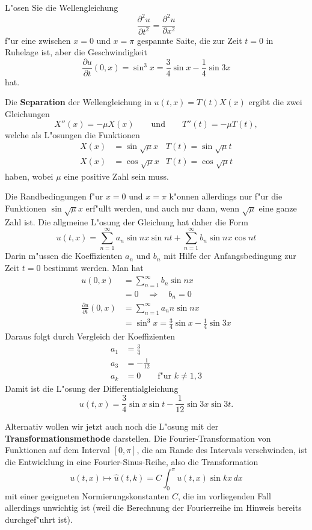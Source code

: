 L"osen Sie die Wellengleichung
\[
\frac{\partial^2 u}{\partial t^2}=\frac{\partial^2 u}{\partial x^2}
\]
f"ur eine zwischen $x=0$ und $x=\pi$ gespannte Saite,
die zur Zeit $t=0$ in Ruhelage ist, aber die Geschwindigkeit
\[
\frac{\partial u}{\partial t}(0, x)
=
\sin^3 x=\frac34\sin x-\frac14\sin 3x
\]
hat.

\begin{loesung}
Die {\bf Separation} der Wellengleichung in $u(t,x)=T(t)X(x)$ ergibt die
zwei Gleichungen
\[
X''(x)=-\mu X(x)\qquad\text{und}\qquad T''(t)=-\mu T(t),
\]
welche als L"osungen die Funktionen
\begin{align*}
X(x)&=\sin\sqrt{\mu}x & T(t)=\sin\sqrt{\mu}t\\
X(x)&=\cos\sqrt{\mu}x & T(t)=\cos\sqrt{\mu}t
\end{align*}
haben, wobei $\mu$ eine positive Zahl sein muss.

Die Randbedingungen f"ur $x=0$ und $x=\pi$ k"onnen allerdings nur
f"ur die Funktionen $\sin\sqrt{\mu}x$ erf"ullt werden, und auch nur dann,
wenn $\sqrt{\mu}$ eine ganze Zahl ist. Die allgmeine L"osung der Gleichung
hat daher die Form
\[
u(t,x)
=
\sum_{n=1}^\infty a_n\sin nx \sin nt+\sum_{n=1}^\infty b_n\sin nx\cos nt
\]
Darin m"ussen die Koeffizienten $a_n$ und $b_n$ mit Hilfe der 
Anfangsbedingung zur Zeit $t=0$ bestimmt werden. Man hat
\begin{align*}
u(0,x)&=
\sum_{n=1}^\infty b_n\sin nx
\\
&=0\quad\Rightarrow\quad b_n=0
\\
\frac{\partial u}{\partial t}(0,x)
&=
\sum_{n=1}^\infty a_nn\sin nx
\\
&=
\sin^3 x=\frac34\sin x-\frac14\sin 3x
\end{align*}
Daraus folgt durch Vergleich der Koeffizienten
\begin{align*}
a_1&=\frac34\\
a_3&=-\frac{1}{12}\\
a_k&=0\qquad\text{f"ur $k\ne 1,3$}
\end{align*}
Damit ist die L"osung der Differentialgleichung
\[
u(t,x)
= \frac34\sin x \sin t -\frac1{12}\sin 3x \sin 3t.
\]

Alternativ wollen wir jetzt auch noch die L"osung mit der
{\bf Transformationsmethode} darstellen. Die Fourier-Transformation
von Funktionen auf dem Interval $[0,\pi]$, die am Rande
des Intervals verschwinden, ist die Entwicklung in eine Fourier-Sinus-Reihe,
also die Transformation 
\[u(t,x) \mapsto \hat u(t, k)= C\int_0^{\pi} u(t,x)\sin kx\, dx\]
mit einer geeigneten Normierungskonstanten $C$, die im vorliegenden
Fall allerdings unwichtig ist (weil die Berechnung der Fourierreihe
im Hinweis bereits durchgef"uhrt ist).


\end{loesung}
